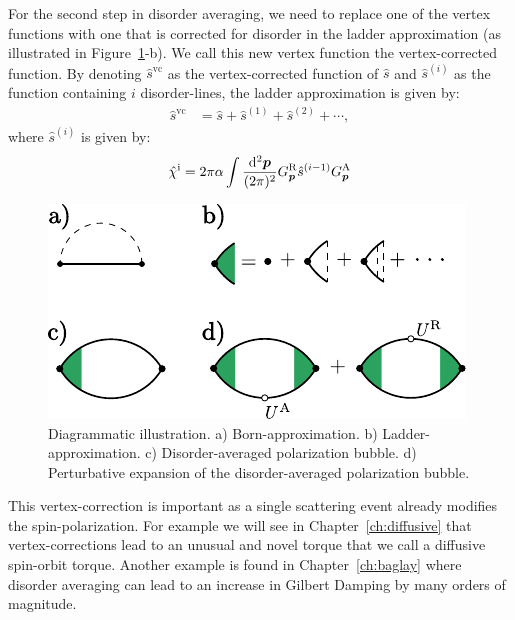 For the second step in disorder averaging, we need to replace one of the vertex functions with one that is corrected for disorder in the ladder approximation (as illustrated in Figure~\ref{sd:fig:diagrams}-b). We call this new vertex function the vertex-corrected function. 
By denoting $\hat{s}^{\text{vc}}$ as the vertex-corrected function of $\hat{s}$ and $\hat{s}^{(i)}$ as the function containing $i$ disorder-lines, the ladder approximation is given by:
\begin{align}
    \hat{s}^\text{vc}
       & =           
        \hat{s}+\hat{s}^{(1)}+\hat{s}^{(2)}+\cdots,
        \label{sd:eq:ladder}
\end{align}
where $\hat{s}^{(i)}$ is given by:
\begin{align}
    \hat{\chi}^\text{i} = 2\pi\alpha\int\frac{\mathrm{d}^2\boldsymbol{p}}{(2\pi)^2} G_{\boldsymbol{p}}^\text{R}\hat{s}^{(i-1)}G_{\boldsymbol{p}}^\text{A}
    \label{eq:onedisorderline}
\end{align}

\begin{figure}
    \centering
    \includegraphics{articles/misha_paper/app5.pdf}
    \caption{Diagrammatic illustration. a) Born-approximation. b) Ladder-approximation. c) Disorder-averaged polarization bubble. d) Perturbative expansion of the disorder-averaged polarization bubble. }
    \label{sd:fig:diagrams}
\end{figure}
This vertex-correction is important as a single scattering event already modifies the spin-polarization. For example we will see in Chapter~\ref{ch:diffusive} that vertex-corrections lead to an unusual and novel torque that we call a diffusive spin-orbit torque. Another example is found in Chapter~\ref{ch:baglay} where disorder averaging can lead to an increase in Gilbert Damping by many orders of magnitude. 


